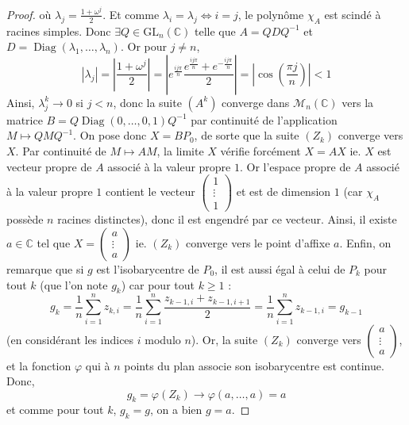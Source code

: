 \begin{proof}
		où $\lambda_j = \frac{1+\omega^j}{2}$. Et comme $\lambda_i = \lambda_j \iff i = j$, le polynôme $\chi_A$ est scindé à racines simples. Donc $\exists Q \in \mathrm{GL}_n(\mathbb{C})$ telle que $A=QDQ^{-1}$ et $D = \operatorname{Diag}(\lambda_1, \dots, \lambda_n)$.
		Or pour $j \neq n$,
		\[ |\lambda_j| = \left| \frac{1 + \omega^j}{2} \right| = \left| e^{\frac{ij \pi}{n}} \frac{e^{\frac{ij \pi}{n}} + e^{-\frac{ij \pi}{n}}}{2} \right| = \left| \cos \left( \frac{\pi j}{n} \right) \right| < 1 \]
		Ainsi, $\lambda_j^k \longrightarrow 0$ si $j < n$, donc la suite $(A^k)$ converge dans $\mathcal{M}_n(\mathbb{C})$ vers la matrice $B = Q \operatorname{Diag}(0, \dots, 0, 1)Q^{-1}$ par continuité de l'application $M \mapsto QMQ^{-1}$.
		\newpar
		On pose donc $X = B P_0$, de sorte que la suite $(Z_k)$ converge vers $X$. Par continuité de $M \mapsto AM$, la limite $X$ vérifie forcément $X = AX$ ie. $X$ est vecteur propre de $A$ associé à la valeur propre $1$. Or l'espace propre de $A$ associé à la valeur propre $1$ contient le vecteur $\begin{pmatrix} 1 \\ \vdots \\ 1 \end{pmatrix}$ et est de dimension $1$ (car $\chi_A$ possède $n$ racines distinctes), donc il est engendré par ce vecteur. Ainsi, il existe $a \in \mathbb{C}$ tel que $X = \begin{pmatrix} a \\ \vdots \\ a \end{pmatrix}$ ie. $(Z_k)$ converge vers le point d'affixe $a$.
		\newpar
		Enfin, on remarque que si $g$ est l'isobarycentre de $P_0$, il est aussi égal à celui de $P_k$ pour tout $k$ (que l'on note $g_k$) car pour tout $k \geq 1$ :
		\[ g_k = \frac{1}{n} \sum_{i=1}^n z_{k,i} = \frac{1}{n} \sum_{i=1}^n \frac{z_{k-1,i} + z_{k-1,i+1}}{2} = \frac{1}{n} \sum_{i=1}^n z_{k-1,i} = g_{k-1} \]
		(en considérant les indices $i$ modulo $n$). Or, la suite $(Z_k)$ converge vers $\begin{pmatrix} a \\ \vdots \\ a \end{pmatrix}$, et la fonction $\varphi$ qui à $n$ points du plan associe son isobarycentre est continue. Donc,
		\[ g_k = \varphi(Z_k) \longrightarrow \varphi(a, \dots, a) = a \]
		et comme pour tout $k$, $g_k = g$, on a bien $g = a$.
	\end{proof}

